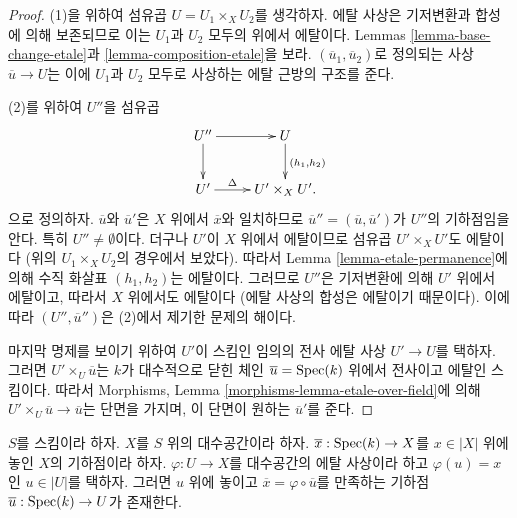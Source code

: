 \begin{proof}
(1)을 위하여 섬유곱 $U = U_1 \times_X U_2$를 생각하자.
에탈 사상은 기저변환과 합성에 의해 보존되므로 이는
$U_1$과 $U_2$ 모두의 위에서 에탈이다. Lemmas
\ref{lemma-base-change-etale}과 \ref{lemma-composition-etale}을 보라.
$(\overline{u}_1, \overline{u}_2)$로 정의되는 사상
$\overline{u} \to U$는 이에 $U_1$과 $U_2$ 모두로 사상하는
에탈 근방의 구조를 준다.

\medskip\noindent
(2)를 위하여 $U''$을 섬유곱
$$
\xymatrix{
U'' \ar[r] \ar[d] & U \ar[d]^{(h_1, h_2)} \\
U' \ar[r]^-\Delta & U' \times_X U'.
}
$$
으로 정의하자. $\overline{u}$와 $\overline{u}'$은
$X$ 위에서 $\overline{x}$와 일치하므로
$\overline{u}'' = (\overline{u}, \overline{u}')$가 $U''$의
기하점임을 안다. 특히 $U'' \not = \emptyset$이다.
더구나 $U'$이 $X$ 위에서 에탈이므로 섬유곱
$U'\times_X U'$도 에탈이다
(위의 $U_1 \times_X U_2$의 경우에서 보았다).
따라서 Lemma \ref{lemma-etale-permanence}에 의해 수직 화살표
$(h_1, h_2)$는 에탈이다. 그러므로 $U''$은 기저변환에 의해
$U'$ 위에서 에탈이고, 따라서 $X$ 위에서도 에탈이다
(에탈 사상의 합성은 에탈이기 때문이다).
이에 따라 $(U'', \overline{u}'')$은 (2)에서 제기한 문제의 해이다.

\medskip\noindent
마지막 명제를 보이기 위하여 $U'$이 스킴인 임의의 전사 에탈 사상
$U' \to U$를 택하자. 그러면 $U' \times_U \overline{u}$는
$k$가 대수적으로 닫힌 체인 $\overline{u} = \mathop{\mathrm{Spec}}(k)$ 위에서
전사이고 에탈인 스킴이다. 따라서 Morphisms, Lemma
\ref{morphisms-lemma-etale-over-field}에 의해
$U' \times_U \overline{u} \to \overline{u}$는 단면을 가지며,
이 단면이 원하는 $\overline{u}'$를 준다.
\end{proof}

\begin{lemma}
\label{lemma-geometric-lift-to-usual}
$S$를 스킴이라 하자. $X$를 $S$ 위의 대수공간이라 하자.
$\overline{x} : \mathop{\mathrm{Spec}}(k) \to X$를 $x \in |X|$ 위에 놓인
$X$의 기하점이라 하자. $\varphi : U \to X$를 대수공간의 에탈
사상이라 하고 $\varphi(u) = x$인 $u \in |U|$를 택하자.
그러면 $u$ 위에 놓이고
$\overline{x} = \varphi \circ \overline{u}$를 만족하는 기하점
$\overline{u} : \mathop{\mathrm{Spec}}(k) \to U$가 존재한다.
\end{lemma}

